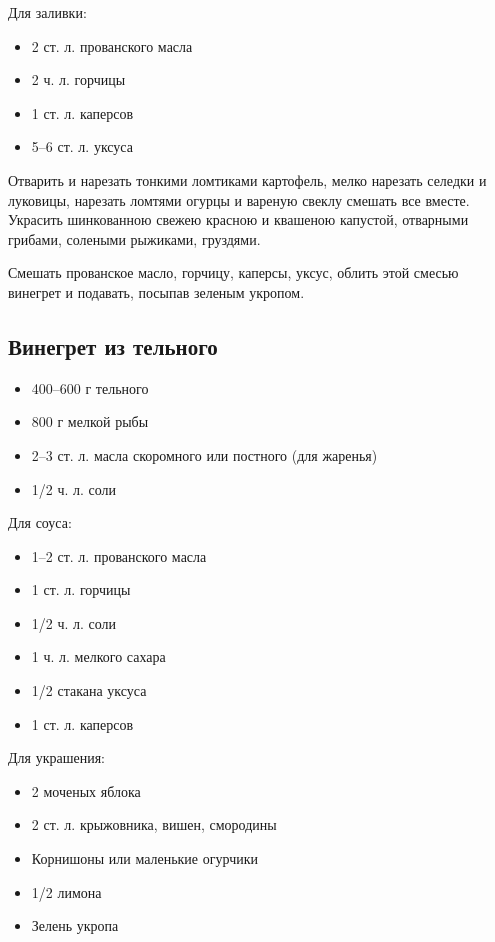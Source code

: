 Для заливки: 

\begin{itemize}
	\item 2 ст. л. прованского масла
    \item 2 ч. л. горчицы 
    \item 1 ст. л. каперсов
    \item 5–6 ст. л. уксуса
\end{itemize}

Отварить и нарезать тонкими ломтиками картофель, мелко нарезать селедки и луковицы, нарезать ломтями огурцы и вареную свеклу смешать все вместе. Украсить шинкованною свежею красною и квашеною капустой, отварными грибами, солеными рыжиками, груздями.

Смешать прованское масло, горчицу, каперсы, уксус, облить этой смесью винегрет и подавать, посыпав зеленым укропом.

\subsection{Винегрет из тельного}

\begin{itemize}
	\item 400–600 г тельного
    \item 800 г мелкой рыбы 
    \item 2–3 ст. л. масла скоромного или постного (для жаренья)
    \item 1/2 ч. л. соли
\end{itemize}

Для соуса: 

\begin{itemize}
	\item 1–2 ст. л. прованского масла
    \item 1 ст. л. горчицы 
    \item 1/2 ч. л. соли 
    \item 1 ч. л. мелкого сахара
    \item 1/2 стакана уксуса
    \item 1 ст. л. каперсов
\end{itemize}

Для украшения: 

\begin{itemize}
	\item 2 моченых яблока
    \item 2 ст. л. крыжовника, вишен, смородины 
    \item Корнишоны или маленькие огурчики
    \item 1/2 лимона 
    \item Зелень укропа
\end{itemize}

